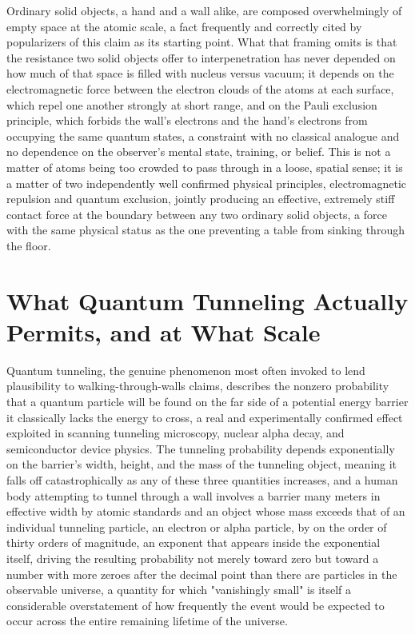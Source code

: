 \documentclass[11pt]{article}
\begin{document}
Ordinary solid objects, a hand and a wall alike, are composed overwhelmingly of empty space at the atomic scale, a fact frequently and correctly cited by popularizers of this claim as its starting point. What that framing omits is that the resistance two solid objects offer to interpenetration has never depended on how much of that space is filled with nucleus versus vacuum; it depends on the electromagnetic force between the electron clouds of the atoms at each surface, which repel one another strongly at short range, and on the Pauli exclusion principle, which forbids the wall's electrons and the hand's electrons from occupying the same quantum states, a constraint with no classical analogue and no dependence on the observer's mental state, training, or belief. This is not a matter of atoms being too crowded to pass through in a loose, spatial sense; it is a matter of two independently well confirmed physical principles, electromagnetic repulsion and quantum exclusion, jointly producing an effective, extremely stiff contact force at the boundary between any two ordinary solid objects, a force with the same physical status as the one preventing a table from sinking through the floor.

\section{What Quantum Tunneling Actually Permits, and at What Scale}

Quantum tunneling, the genuine phenomenon most often invoked to lend plausibility to walking-through-walls claims, describes the nonzero probability that a quantum particle will be found on the far side of a potential energy barrier it classically lacks the energy to cross, a real and experimentally confirmed effect exploited in scanning tunneling microscopy, nuclear alpha decay, and semiconductor device physics. The tunneling probability depends exponentially on the barrier's width, height, and the mass of the tunneling object, meaning it falls off catastrophically as any of these three quantities increases, and a human body attempting to tunnel through a wall involves a barrier many meters in effective width by atomic standards and an object whose mass exceeds that of an individual tunneling particle, an electron or alpha particle, by on the order of thirty orders of magnitude, an exponent that appears inside the exponential itself, driving the resulting probability not merely toward zero but toward a number with more zeroes after the decimal point than there are particles in the observable universe, a quantity for which "vanishingly small" is itself a considerable overstatement of how frequently the event would be expected to occur across the entire remaining lifetime of the universe.
\end{document}
